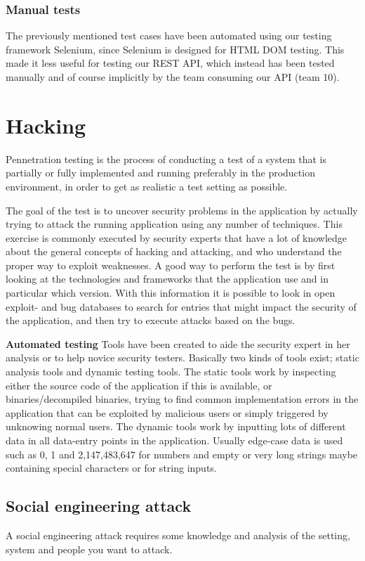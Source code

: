 \documentclass[a4paper]{article}
\begin{document}
\subsubsection{Manual tests}
The previously mentioned test cases have been automated using our testing framework Selenium, since Selenium is designed for HTML DOM testing. This made it less useful for testing our REST API, which instead has been tested manually and of course implicitly by the team consuming our API (team 10).

\section{Hacking}
Pennetration testing is the process of conducting a test of a system that is partially or fully implemented and running preferably in the production environment, in order to get as realistic a test setting as possible.

The goal of the test is to uncover security problems in the application by actually trying to attack the running application using any number of techniques. This exercise is commonly executed by security experts that have a lot of knowledge about the general concepts of hacking and attacking, and who understand the proper way to exploit weaknesses. 
A good way to perform the test is by first looking at the technologies and frameworks that the application use and in particular which version. With this information it is possible to look in open exploit- and bug databases to search for entries that might impact the security of the application, and then try to execute attacks based on the bugs.

\textbf{Automated testing}
Tools have been created to aide the security expert in her analysis or to help novice security testers. Basically two kinds of tools exist; static analysis tools and dynamic testing tools.
The static tools work by inspecting either the source code of the application if this is available, or binaries/decompiled binaries, trying to find common implementation errors in the application that can be exploited by malicious users or simply triggered by unknowing normal users.
The dynamic tools work by inputting lots of different data in all data-entry points in the application. Usually edge-case data is used such as 0, 1 and 2,147,483,647 for numbers and empty or very long strings maybe containing special characters or for string inputs.

\subsection{Social engineering attack}
A social engineering attack requires some knowledge and analysis of the setting, system and people you want to attack.
\end{document}
